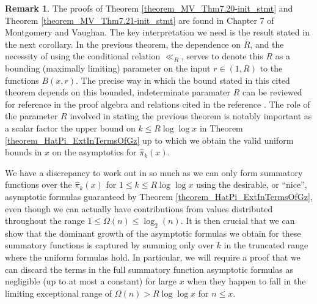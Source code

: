 \documentclass[11pt,reqno,a4letter]{article}
\numberwithin{figure}{section}
\numberwithin{table}{section}
\theoremstyle{plain}
\numberwithin{theorem}{section}
\theoremstyle{definition}
\newtheorem{remark}[theorem]{Remark}
\begin{document}
\begin{remark} 
The proofs of Theorem \ref{theorem_MV_Thm7.20-init_stmt} and 
Theorem \ref{theorem_MV_Thm7.21-init_stmt} 
are found in Chapter 7 of Montgomery and Vaughan. 
The key interpretation we need is the result stated in the next corollary. 
In the previous theorem, the dependence on $R$, and the necessity of using the 
conditional relation $\ll_R$, serves to denote this $R$ as a 
bounding (maximally limiting) parameter on the 
input $r \in (1, R)$ to the functions $B(x, r)$. 
The precise way in which the bound 
stated in this cited theorem depends on this bounded, 
indeterminate paramater $R$ can be reviewed for reference in the proof 
algebra and relations cited in the reference \cite[\S 7]{MV}. 
The role of the parameter $R$ involved in stating the previous theorem 
is notably important as a scalar factor the upper bound on $k \leq R\log\log x$ in 
Theorem \ref{theorem_HatPi_ExtInTermsOfGz} up to which 
we obtain the valid uniform bounds in $x$ on the asymptotics for 
$\widehat{\pi}_k(x)$. 

We have a discrepancy to work out in so much as we 
can only form summatory functions over the $\widehat{\pi}_k(x)$ for 
$1 \leq k \leq R\log\log x$ using the desirable, or ``nice'', asymptotic formulas
guaranteed by Theorem \ref{theorem_HatPi_ExtInTermsOfGz}, even though we can actually 
have contributions from values distributed throughout the range $1 \leq \Omega(n) \leq \log_2(n)$. 
It is then crucial that we can show that the dominant growth of the asymptotic formulas we obtain 
for these summatory functions is captured by summing only over $k$ in the truncated range 
where the uniform formulas hold. In particular, we will require a proof 
that we can discard the terms in the full summatory function 
asymptotic formulas as negligible (up to at most a constant) 
for large $x$ when they happen to fall in the 
limiting exceptional range of $\Omega(n) > R\log\log x$ for $n \leq x$. 
\end{remark} 
\end{document}
